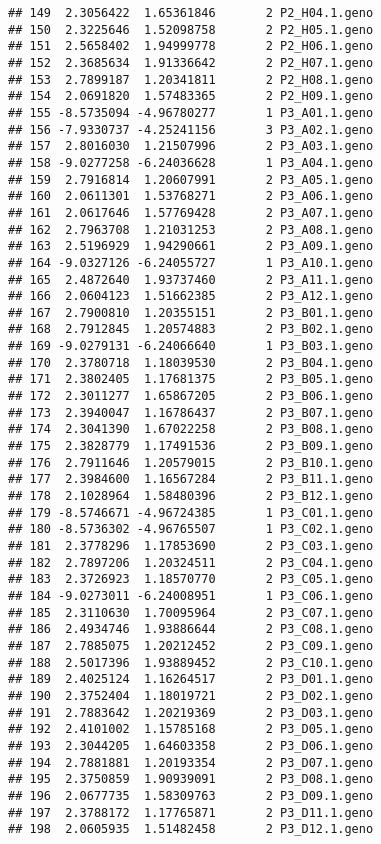 \documentclass[]{article}
\begin{document}
\begin{verbatim}
## 149  2.3056422  1.65361846       2 P2_H04.1.geno
## 150  2.3225646  1.52098758       2 P2_H05.1.geno
## 151  2.5658402  1.94999778       2 P2_H06.1.geno
## 152  2.3685634  1.91336642       2 P2_H07.1.geno
## 153  2.7899187  1.20341811       2 P2_H08.1.geno
## 154  2.0691820  1.57483365       2 P2_H09.1.geno
## 155 -8.5735094 -4.96780277       1 P3_A01.1.geno
## 156 -7.9330737 -4.25241156       3 P3_A02.1.geno
## 157  2.8016030  1.21507996       2 P3_A03.1.geno
## 158 -9.0277258 -6.24036628       1 P3_A04.1.geno
## 159  2.7916814  1.20607991       2 P3_A05.1.geno
## 160  2.0611301  1.53768271       2 P3_A06.1.geno
## 161  2.0617646  1.57769428       2 P3_A07.1.geno
## 162  2.7963708  1.21031253       2 P3_A08.1.geno
## 163  2.5196929  1.94290661       2 P3_A09.1.geno
## 164 -9.0327126 -6.24055727       1 P3_A10.1.geno
## 165  2.4872640  1.93737460       2 P3_A11.1.geno
## 166  2.0604123  1.51662385       2 P3_A12.1.geno
## 167  2.7900810  1.20355151       2 P3_B01.1.geno
## 168  2.7912845  1.20574883       2 P3_B02.1.geno
## 169 -9.0279131 -6.24066640       1 P3_B03.1.geno
## 170  2.3780718  1.18039530       2 P3_B04.1.geno
## 171  2.3802405  1.17681375       2 P3_B05.1.geno
## 172  2.3011277  1.65867205       2 P3_B06.1.geno
## 173  2.3940047  1.16786437       2 P3_B07.1.geno
## 174  2.3041390  1.67022258       2 P3_B08.1.geno
## 175  2.3828779  1.17491536       2 P3_B09.1.geno
## 176  2.7911646  1.20579015       2 P3_B10.1.geno
## 177  2.3984600  1.16567284       2 P3_B11.1.geno
## 178  2.1028964  1.58480396       2 P3_B12.1.geno
## 179 -8.5746671 -4.96724385       1 P3_C01.1.geno
## 180 -8.5736302 -4.96765507       1 P3_C02.1.geno
## 181  2.3778296  1.17853690       2 P3_C03.1.geno
## 182  2.7897206  1.20324511       2 P3_C04.1.geno
## 183  2.3726923  1.18570770       2 P3_C05.1.geno
## 184 -9.0273011 -6.24008951       1 P3_C06.1.geno
## 185  2.3110630  1.70095964       2 P3_C07.1.geno
## 186  2.4934746  1.93886644       2 P3_C08.1.geno
## 187  2.7885075  1.20212452       2 P3_C09.1.geno
## 188  2.5017396  1.93889452       2 P3_C10.1.geno
## 189  2.4025124  1.16264517       2 P3_D01.1.geno
## 190  2.3752404  1.18019721       2 P3_D02.1.geno
## 191  2.7883642  1.20219369       2 P3_D03.1.geno
## 192  2.4101002  1.15785168       2 P3_D05.1.geno
## 193  2.3044205  1.64603358       2 P3_D06.1.geno
## 194  2.7881881  1.20193354       2 P3_D07.1.geno
## 195  2.3750859  1.90939091       2 P3_D08.1.geno
## 196  2.0677735  1.58309763       2 P3_D09.1.geno
## 197  2.3788172  1.17765871       2 P3_D11.1.geno
## 198  2.0605935  1.51482458       2 P3_D12.1.geno

\end{verbatim}
\end{document}

